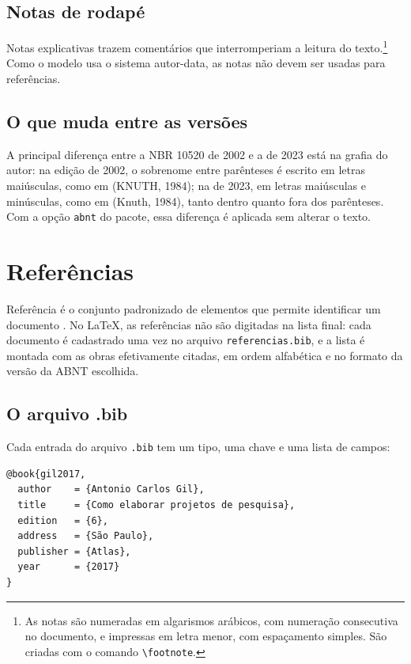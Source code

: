 \documentclass[
	12pt, %
	openright, %
	oneside, %
	a4paper, %
	sumario=tradicional, %
	english, %
	brazil, %
]{abntex2}
\begin{document}
\section{Notas de rodapé}\label{sec:notas}

Notas explicativas trazem comentários que interromperiam a leitura do texto.\footnote{As notas são numeradas em algarismos arábicos, com numeração consecutiva no documento, e impressas em letra menor, com espaçamento simples. São criadas com o comando \texttt{\textbackslash footnote}.} Como o modelo usa o sistema autor-data, as notas não devem ser usadas para referências.

\section{O que muda entre as versões}\label{sec:mudancas-citacoes}

A principal diferença entre a NBR 10520 de 2002 \cite{abnt10520-2002} e a de 2023 \cite{abnt10520} está na grafia do autor: na edição de 2002, o sobrenome entre parênteses é escrito em letras maiúsculas, como em (KNUTH, 1984); na de 2023, em letras maiúsculas e minúsculas, como em (Knuth, 1984), tanto dentro quanto fora dos parênteses. Com a opção \texttt{abnt} do pacote, essa diferença é aplicada sem alterar o texto.
\chapter{Referências}\label{cap:referencias}

Referência é o conjunto padronizado de elementos que permite identificar um documento \cite{abnt6023}. No \LaTeX, as referências não são digitadas na lista final: cada documento é cadastrado uma vez no arquivo \texttt{referencias.bib}, e a lista é montada com as obras efetivamente citadas, em ordem alfabética e no formato da versão da ABNT escolhida.

\section{O arquivo .bib}\label{sec:arquivo-bib}

Cada entrada do arquivo \texttt{.bib} tem um tipo, uma chave e uma lista de campos:

\begin{verbatim}
@book{gil2017,
  author    = {Antonio Carlos Gil},
  title     = {Como elaborar projetos de pesquisa},
  edition   = {6},
  address   = {São Paulo},
  publisher = {Atlas},
  year      = {2017}
}
\end{verbatim}
\end{document}
